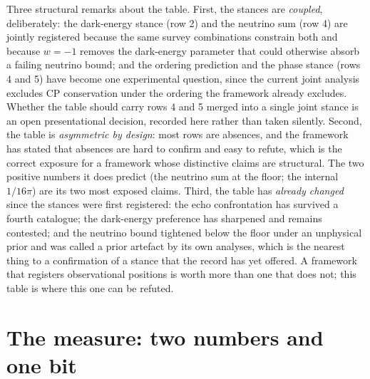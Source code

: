 \documentclass[11pt]{article}
\theoremstyle{definition}
\theoremstyle{plain}
\begin{document}
 Three structural remarks about the table. First, the stances are \emph{coupled}, deliberately: the dark-energy stance (row 2) and the neutrino sum (row 4) are jointly registered because the same survey combinations constrain both and because $w = -1$ removes the dark-energy parameter that could otherwise absorb a failing neutrino bound; and the ordering prediction and the phase stance (rows 4 and 5) have become one experimental question, since the current joint analysis excludes CP conservation under the ordering the framework already excludes. Whether the table should carry rows 4 and 5 merged into a single joint stance is an open presentational decision, recorded here rather than taken silently. Second, the table is \emph{asymmetric by design}: most rows are absences, and the framework has stated that absences are hard to confirm and easy to refute, which is the correct exposure for a framework whose distinctive claims are structural. The two positive numbers it does predict (the neutrino sum at the floor; the internal $1/16\pi$) are its two most exposed claims. Third, the table has \emph{already changed} since the stances were first registered: the echo confrontation has survived a fourth catalogue; the dark-energy preference has sharpened and remains contested; and the neutrino bound tightened below the floor under an unphysical prior and was called a prior artefact by its own analyses, which is the nearest thing to a confirmation of a stance that the record has yet offered. A framework that registers observational positions is worth more than one that does not; this table is where this one can be refuted.

\section{The measure: two numbers and one bit}
\end{document}
